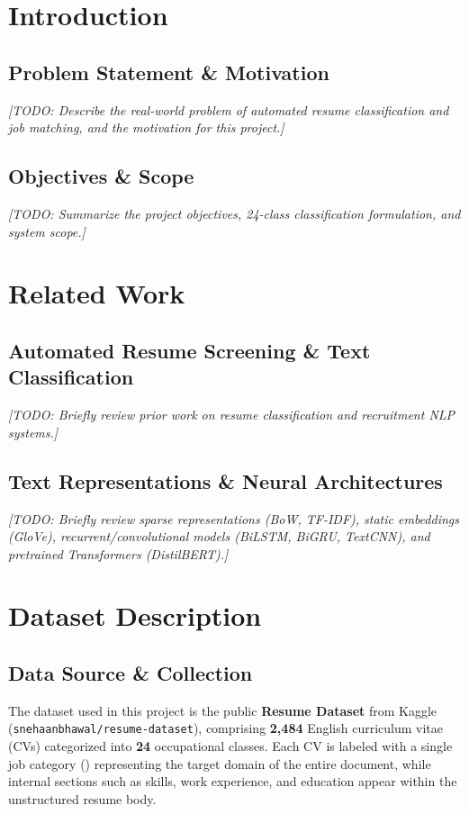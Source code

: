 \documentclass[11pt,a4paper]{article}
\newcommand{\code}[1]{{\ttfamily\detokenize{#1}}}
\begin{document}
\tableofcontents
\clearpage
{}
\hypersetup{pageanchor=true}

\section{Introduction}
\subsection{Problem Statement \& Motivation}
\par\noindent\textit{[TODO: Describe the real-world problem of automated resume classification and job matching, and the motivation for this project.]}

\subsection{Objectives \& Scope}
\par\noindent\textit{[TODO: Summarize the project objectives, 24-class classification formulation, and system scope.]}

\section{Related Work}
\subsection{Automated Resume Screening \& Text Classification}
\par\noindent\textit{[TODO: Briefly review prior work on resume classification and recruitment NLP systems.]}

\subsection{Text Representations \& Neural Architectures}
\par\noindent\textit{[TODO: Briefly review sparse representations (BoW, TF-IDF), static embeddings (GloVe), recurrent/convolutional models (BiLSTM, BiGRU, TextCNN), and pretrained Transformers (DistilBERT).]}

\section{Dataset Description}
\subsection{Data Source \& Collection}
The dataset used in this project is the public \textbf{Resume Dataset} from Kaggle (\texttt{snehaanbhawal/\allowbreak resume-dataset}), comprising \textbf{2,484} English curriculum vitae (CVs) categorized into \textbf{24} occupational classes. Each CV is labeled with a single job category (\code{Category}) representing the target domain of the entire document, while internal sections such as skills, work experience, and education appear within the unstructured resume body.
\end{document}
